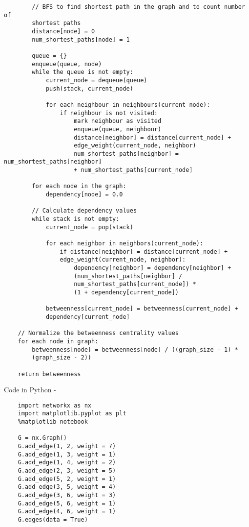 \documentclass{article}
\begin{document}
\begin{itemize}
\begin{verbatim}
        // BFS to find shortest path in the graph and to count number of
        shortest paths
        distance[node] = 0
        num_shortest_paths[node] = 1

        queue = {}
        enqueue(queue, node)
        while the queue is not empty:
            current_node = dequeue(queue)
            push(stack, current_node)

            for each neighbour in neighbours(current_node):
                if neighbour is not visited:
                    mark neighbour as visited 
                    enqueue(queue, neighbour)
                    distance[neighbor] = distance[current_node] + 
                    edge_weight(current_node, neighbor)
                    num_shortest_paths[neighbor] = num_shortest_paths[neighbor] 
                    + num_shortest_paths[current_node]

        for each node in the graph:
            dependency[node] = 0.0

        // Calculate dependency values
        while stack is not empty:
            current_node = pop(stack)

            for each neighbor in neighbors(current_node):
                if distance[neighbor] = distance[current_node] +
                edge_weight(current_node, neighbor):
                    dependency[neighbor] = dependency[neighbor] + 
                    (num_shortest_paths[neighbor] / 
                    num_shortest_paths[current_node]) * 
                    (1 + dependency[current_node])

            betweenness[current_node] = betweenness[current_node] +
            dependency[current_node]

    // Normalize the betweenness centrality values 
    for each node in graph:
        betweenness[node] = betweenness[node] / ((graph_size - 1) * 
        (graph_size - 2))

    return betweenness
\end{verbatim}

Code in Python - 

\begin{verbatim}
    import networkx as nx
    import matplotlib.pyplot as plt 
    %matplotlib notebook

    G = nx.Graph()
    G.add_edge(1, 2, weight = 7)
    G.add_edge(1, 3, weight = 1)
    G.add_edge(1, 4, weight = 2)
    G.add_edge(2, 3, weight = 5)
    G.add_edge(5, 2, weight = 1)
    G.add_edge(3, 5, weight = 4)
    G.add_edge(3, 6, weight = 3)
    G.add_edge(5, 6, weight = 1)
    G.add_edge(4, 6, weight = 1)
    G.edges(data = True)


\end{verbatim}
\end{itemize}
\end{document}
